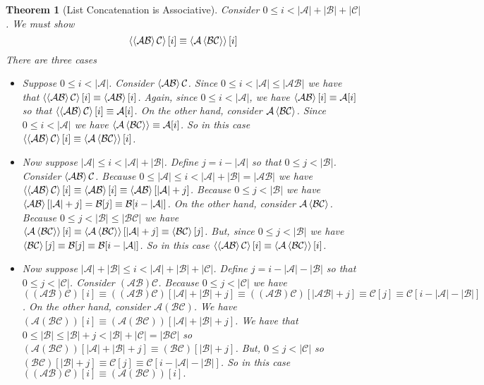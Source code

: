 \documentclass[12pt]{article}
\theoremstyle{break}
\theoremstyle{break}
\newtheorem{theorem}{Theorem}[section]
\theoremstyle{break}
\theoremstyle{break}
\newcommand{\mc}[1]{\mathcal{#1}}
\begin{document}
\begin{theorem}[List Concatenation is Associative]
Consider $0 \le i < |\mc{A}| + |\mc{B}| + |\mc{C}|$.
We must show
$$
\Braket{\Braket{\mc{A}\mc{B}}\mc{C}}[i] \equiv \Braket{\mc{A}\Braket{\mc{B}\mc{C}}}[i]
$$
There are three cases
\begin{itemize}
\item{
Suppose $0 \le i < |\mc{A}|$. 
Consider $\Braket{\mc{A}\mc{B}}\mc{C}$. 
Since $0 \le i < |\mc{A}| \le |\mc{A}\mc{B}|$ we have that $\Braket{\Braket{\mc{A}\mc{B}}\mc{C}}[i] \equiv \Braket{\mc{A}\mc{B}}[i]$. 
Again, since $0\le i < |\mc{A}|$, we have $\Braket{\mc{A}\mc{B}}[i] \equiv \mc{A}[i]$ so that $\Braket{\Braket{\mc{A}\mc{B}}\mc{C}}[i] \equiv \mc{A}[i]$. 
On the other hand, consider $\mc{A}\Braket{\mc{B}\mc{C}}$. 
Since $0 \le i < |\mc{A}|$ we have $\Braket{\mc{A}\Braket{\mc{B}\mc{C}}} \equiv \mc{A}[i]$. 
So in this case $\Braket{\Braket{\mc{A}\mc{B}}\mc{C}}[i] \equiv \Braket{\mc{A}\Braket{\mc{B}\mc{C}}}[i]$.
}
\item{
Now suppose $|\mc{A}| \le i < |\mc{A}| + |\mc{B}|$. 
Define $j = i - |\mc{A}|$ so that $0 \le j < |\mc{B}|$. 
Consider $\Braket{\mc{A}\mc{B}}\mc{C}$. 
Because $0 \le |\mc{A}| \le i < |\mc{A}| + |\mc{B}| = |\mc{A}\mc{B}|$ we have $\Braket{\Braket{\mc{A}\mc{B}}\mc{C}}[i] \equiv \Braket{\mc{A}\mc{B}}[i] \equiv \Braket{\mc{A}\mc{B}}[|\mc{A}| + j]$. Because $0 \le j < |\mc{B}|$ we have $\Braket{\mc{A}\mc{B}}[|\mc{A}|+j] = \mc{B}[j] \equiv \mc{B}[i - |\mc{A}|]$. 
On the other hand, consider $\mc{A}\Braket{\mc{B}\mc{C}}$. 
Because $0 \le j < |\mc{B}| \le |\mc{B}\mc{C}|$ we have $\Braket{\mc{A}\Braket{\mc{B}\mc{C}}}[i] \equiv \Braket{\mc{A}\Braket{\mc{B}\mc{C}}}[|\mc{A}| + j] \equiv \Braket{\mc{B}\mc{C}}[j]$. But, since $0 \le j < |\mc{B}|$ we have $\Braket{\mc{B}\mc{C}}[j] \equiv \mc{B}[j] \equiv \mc{B}[i - |\mc{A}|]$. So in this case $\Braket{\Braket{\mc{A}\mc{B}}\mc{C}}[i] \equiv \Braket{\mc{A}\Braket{\mc{B}\mc{C}}}[i]$.
}
\item{
Now suppose $|\mc{A}| + |\mc{B}| \le i < |\mc{A}| + |\mc{B}| + |\mc{C}|$. 
Define $j = i - |\mc{A}| - |\mc{B}|$ so that $0 \le j < |\mc{C}|$. Consider $(\mc{A}\mc{B})\mc{C}$. 
Because $0 \le j < |\mc{C}|$ we have $((\mc{A}\mc{B})\mc{C})[i] \equiv ((\mc{A}\mc{B})\mc{C})[|\mc{A}| + |\mc{B}| + j] \equiv ((\mc{A}\mc{B})\mc{C})[|\mc{A}\mc{B}| + j] \equiv \mc{C}[j] \equiv \mc{C}[i - |\mc{A}| - |\mc{B}|]$. 
On the other hand, consider $\mc{A}(\mc{B}\mc{C})$. 
We have $(\mc{A}(\mc{B}\mc{C}))[i] \equiv (\mc{A}(\mc{B}\mc{C}))[|\mc{A}| + |\mc{B}| + j]$.
We have that $0 \le |\mc{B}| \le |\mc{B}| + j < |\mc{B}| + |\mc{C}| = |\mc{B}\mc{C}|$ so $(\mc{A}(\mc{B}\mc{C}))[|\mc{A}| + |\mc{B}| + j] \equiv (\mc{B}\mc{C})[|\mc{B}| + j]$. 
But, $0 \le j < |\mc{C}|$ so $(\mc{B}\mc{C})[|\mc{B}|+j] \equiv \mc{C}[j] \equiv \mc{C}[i - |\mc{A}|-|\mc{B}|]$. 
So in this case $((\mc{A}\mc{B})\mc{C})[i] \equiv (\mc{A}(\mc{B}\mc{C}))[i].$
}


\end{itemize}
\end{theorem}
\end{document}
